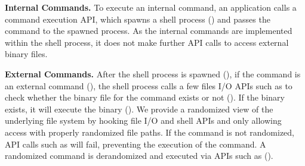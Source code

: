 \noindent
{\bf Internal Commands.}
To execute an internal command, an application calls a command execution API, which spawns a shell process () and passes the command to the spawned process.
As the internal commands are implemented within the shell process, it does not make further API calls to access external binary files.
%

\noindent
{\bf External Commands.}
After the shell process is spawned (), if the command is an external command (), the shell process calls a few files I/O APIs such as  to check whether the binary file for the command exists or not (). 
If the binary exists, it will execute the binary (). 
%
We provide a randomized view of the underlying file system by hooking file I/O and shell APIs and only allowing access with properly randomized file paths. 
If the command is not randomized, API calls such as  will fail, preventing the execution of the command.
A randomized command is derandomized and executed via APIs such as  ().




